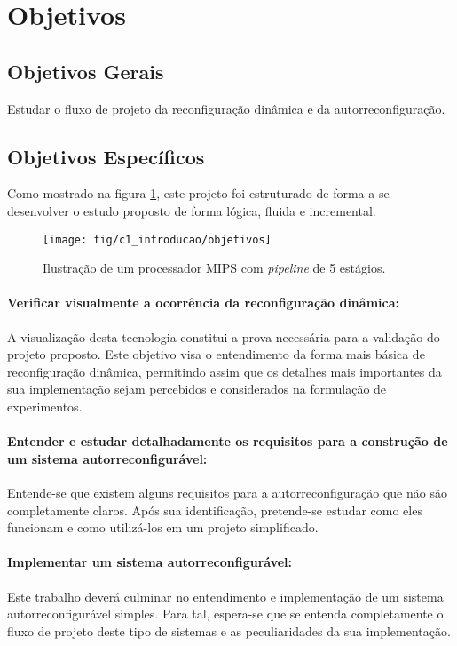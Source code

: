 \documentclass[11pt,a4paper,oneside]{book}
\begin{document}
\section{Objetivos}
\subsection{Objetivos Gerais} Estudar o fluxo de projeto da reconfiguração dinâmica e da autorreconfiguração.

\subsection{Objetivos Específicos}
Como mostrado na figura \ref{fig:objetivos}, este projeto foi estruturado de forma a se desenvolver o estudo proposto de forma lógica, fluida e incremental.

\begin{figure}[h]
\centering
\texttt{[image: fig/c1\_introducao/objetivos]}
\caption{Ilustração de um processador MIPS com \textit{pipeline} de 5 estágios.}
\label{fig:objetivos}
\end{figure}

\paragraph{Verificar visualmente a ocorrência da reconfiguração dinâmica:} A visualização desta tecnologia constitui a prova necessária para a validação do projeto proposto.
Este objetivo visa o entendimento da forma mais básica de reconfiguração dinâmica, permitindo assim que os detalhes mais importantes da sua implementação sejam percebidos e considerados na formulação de experimentos.

\paragraph{Entender e estudar detalhadamente os requisitos para a construção de um sistema autorreconfigurável:} Entende-se que existem alguns requisitos para a autorreconfiguração que não são completamente claros. Após sua identificação, pretende-se estudar como eles funcionam e como utilizá-los em um projeto simplificado.

\paragraph{Implementar um sistema autorreconfigurável:} Este trabalho deverá culminar no entendimento e implementação de um sistema autorreconfigurável simples. Para tal, espera-se que se entenda completamente o fluxo de projeto deste tipo de sistemas e as peculiaridades da sua implementação.
\end{document}
